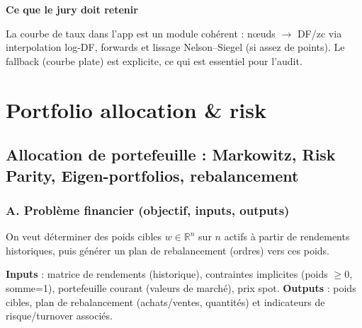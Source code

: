 \documentclass[11pt,a4paper]{report}
\theoremstyle{definition}
\theoremstyle{plain}
\theoremstyle{remark}
\newcommand{\1}{\mathbf{1}}
\newcommand{\R}{\mathbb{R}}
\newcommand{\filepath}[1]{\texttt{\detokenize{#1}}}
\newcommand{\codeid}[1]{\texttt{\detokenize{#1}}}
\newcommand{\NonImplem}{\textbf{non implémenté dans le code actuel}}
\newenvironment{jurybox}{
\par\medskip
\begin{lrbox}{\juryboxbox}
\begin{minipage}{0.97\textwidth}
\textbf{Ce que le jury doit retenir}\par\smallskip
\ignorespaces
}{
\unskip\end{minipage}
\end{lrbox}
\noindent\fcolorbox{black!30}{black!3}{\usebox{\juryboxbox}}
\par\medskip
}
\begin{document}

\begin{jurybox}
La courbe de taux dans l'app est un module cohérent : n\oe{}uds $\to$ DF/zc via interpolation log-DF, forwards et lissage Nelson--Siegel (si assez de points). Le fallback (courbe plate) est explicite, ce qui est essentiel pour l'audit.
\end{jurybox}

\part{Portfolio allocation \& risk}

\chapter{Allocation de portefeuille : Markowitz, Risk Parity, Eigen-portfolios, rebalancement}

\section{A. Problème financier (objectif, inputs, outputs)}
On veut déterminer des poids cibles $w\in\R^n$ sur $n$ actifs à partir de rendements historiques, puis générer un plan de rebalancement (ordres) vers ces poids.

\textbf{Inputs} : matrice de rendements (historique), contraintes implicites (poids $\ge 0$, somme=1), portefeuille courant (valeurs de marché), prix spot.
\textbf{Outputs} : poids cibles, plan de rebalancement (achats/ventes, quantités) et indicateurs de risque/turnover associés.
\end{document}
